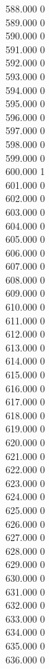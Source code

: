 { 588.000	0 \\
 589.000	0 \\
 590.000	0 \\
 591.000	0 \\
 592.000	0 \\
 593.000	0 \\
 594.000	0 \\
 595.000	0 \\
 596.000	0 \\
 597.000	0 \\
 598.000	0 \\
 599.000	0 \\
 600.000	1 \\
 601.000	0 \\
 602.000	0 \\
 603.000	0 \\
 604.000	0 \\
 605.000	0 \\
 606.000	0 \\
 607.000	0 \\
 608.000	0 \\
 609.000	0 \\
 610.000	0 \\
 611.000	0 \\
 612.000	0 \\
 613.000	0 \\
 614.000	0 \\
 615.000	0 \\
 616.000	0 \\
 617.000	0 \\
 618.000	0 \\
 619.000	0 \\
 620.000	0 \\
 621.000	0 \\
 622.000	0 \\
 623.000	0 \\
 624.000	0 \\
 625.000	0 \\
 626.000	0 \\
 627.000	0 \\
 628.000	0 \\
 629.000	0 \\
 630.000	0 \\
 631.000	0 \\
 632.000	0 \\
 633.000	0 \\
 634.000	0 \\
 635.000	0 \\
 636.000	0 \\
}
